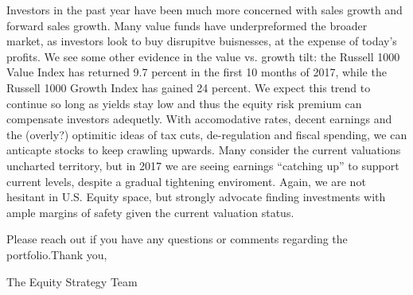 \documentclass[11pt,pressrelease]{newlfm} %
\begin{document}
\begin{newlfm}
\begin{singlespace}
\begin{enumerate}
Investors in the past year have been much more concerned with sales growth and forward sales growth. Many value funds have underpreformed the broader market, as investors look to buy disrupitve buisnesses, at the expense of today's profits. We see some other evidence in the value vs. growth tilt: the Russell 1000 Value Index has returned 9.7 percent in the first 10 months of 2017, while the Russell 1000 Growth Index has gained 24 percent. We expect this trend to continue so long as yields stay low and thus the equity risk premium can compensate investors adequetly. With accomodative rates, decent earnings and the (overly?) optimitic ideas of tax cuts, de-regulation and fiscal spending, we can anticapte stocks to keep crawling upwards. Many consider the current valuations uncharted territory, but in 2017 we are seeing earnings ``catching up'' to support current levels, despite a gradual tightening enviroment. Again, we are not hesitant in U.S. Equity space, but strongly advocate finding investments with ample margins of safety given the current valuation status.\\
\par
\begin{center}
\end{center}

\end{enumerate}
Please reach out if you have any questions or comments regarding the portfolio.Thank you, \par
The Equity Strategy Team


\end{singlespace} %



\end{newlfm}
\end{document}
